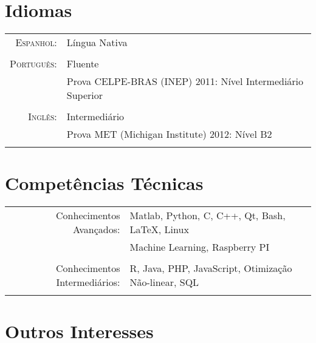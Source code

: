 \documentclass[a4paper,10pt]{article}
\begin{document}
\section{Idiomas}
\begin{longtable}{rl}

    \textsc{Espanhol:}      & Língua Nativa\\
                            &\\

    \textsc{Português:}     & Fluente\\
                            & Prova \textsc{CELPE-BRAS} (INEP) 2011: Nível Intermediário Superior\\
                            &\\

    \textsc{Inglês:}        & Intermediário\\
                            & Prova \textsc{MET} (Michigan Institute) 2012: Nível B2 \\
                            &\\

\end{longtable}

\section{Competências Técnicas}
\begin{longtable}{rl}

    Conhecimentos Avançados:        & Matlab, Python, C, C++, Qt, Bash, \LaTeX, Linux\\
                                    & Machine Learning, Raspberry PI\\
                                    &\\

    Conhecimentos Intermediários:   & R, Java, PHP, JavaScript, Otimização Não-linear, SQL\\
                                    &\\

\end{longtable}

\section{Outros Interesses}
\end{document}
